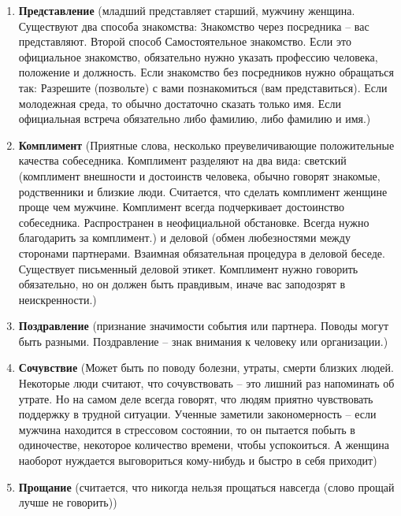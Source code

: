 \documentclass[a4paper,14pt]{extarticle}
\begin{document}
\begin{enumerate}
    \item \textbf{Представление} (младший представляет старший, мужчину женщина. Существуют два способа знакомства: Знакомство через посредника – вас представляют. Второй способ Самостоятельное знакомство. Если это официальное знакомство, обязательно нужно указать профессию человека, положение и должность. Если знакомство без посредников нужно обращаться так: Разрешите (позвольте) с вами познакомиться (вам представиться). Если молодежная среда, то обычно достаточно сказать только имя. Если официальная встреча обязательно либо фамилию, либо фамилию и имя.)
    \item \textbf{Комплимент} (Приятные слова, несколько преувеличивающие положительные качества собеседника. Комплимент разделяют на два вида: светский (комплимент внешности и достоинств человека, обычно говорят знакомые, родственники и близкие люди. Считается, что сделать комплимент женщине проще чем мужчине. Комплимент всегда подчеркивает достоинство собеседника. Распространен в неофициальной обстановке. Всегда нужно благодарить за комплимент.) и деловой (обмен любезностями между сторонами партнерами. Взаимная обязательная процедура в деловой беседе. Существует письменный деловой этикет. Комплимент нужно говорить обязательно, но он должен быть правдивым, иначе вас заподозрят в неискренности.)
    \item \textbf{Поздравление} (признание значимости события или партнера. Поводы могут быть разными. Поздравление – знак внимания к человеку или организации.)
    \item \textbf{Сочувствие} (Может быть по поводу болезни, утраты, смерти близких людей. Некоторые люди считают, что сочувствовать – это лишний раз напоминать об утрате. Но на самом деле всегда говорят, что людям приятно чувствовать поддержку в трудной ситуации. Ученные заметили закономерность – если мужчина находится в стрессовом состоянии, то он пытается побыть в одиночестве, некоторое количество времени, чтобы успокоиться. А женщина наоборот нуждается выговориться кому-нибудь и быстро в себя приходит)
    \item \textbf{Прощание} (считается, что никогда нельзя прощаться навсегда (слово прощай лучше не говорить))

\end{enumerate}
\end{document}
